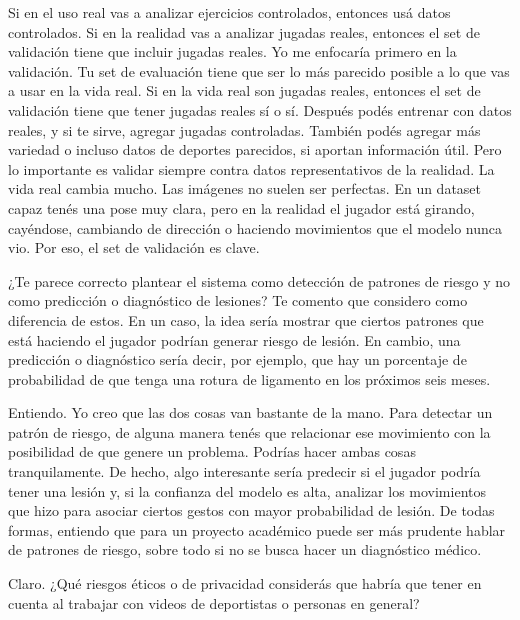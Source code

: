 \begin{description}[leftmargin=0pt, itemindent=\parindent, labelsep=0.5em, itemsep=0pt, parsep=0pt, topsep=0pt]
    \item[\textbf{Gonzalo Pereyra Metnyk:}] Si en el uso real vas a analizar ejercicios controlados, entonces usá datos controlados. Si en la realidad vas a analizar jugadas reales, entonces el set de validación tiene que incluir jugadas reales. Yo me enfocaría primero en la validación. Tu set de evaluación tiene que ser lo más parecido posible a lo que vas a usar en la vida real. Si en la vida real son jugadas reales, entonces el set de validación tiene que tener jugadas reales sí o sí. Después podés entrenar con datos reales, y si te sirve, agregar jugadas controladas. También podés agregar más variedad o incluso datos de deportes parecidos, si aportan información útil. Pero lo importante es validar siempre contra datos representativos de la realidad. La vida real cambia mucho. Las imágenes no suelen ser perfectas. En un dataset capaz tenés una pose muy clara, pero en la realidad el jugador está girando, cayéndose, cambiando de dirección o haciendo movimientos que el modelo nunca vio. Por eso, el set de validación es clave.

    \item[\textbf{Entrevistador:}] ¿Te parece correcto plantear el sistema como detección de patrones de riesgo y no como predicción o diagnóstico de lesiones? Te comento que considero como diferencia de estos. En un caso, la idea sería mostrar que ciertos patrones que está haciendo el jugador podrían generar riesgo de lesión. En cambio, una predicción o diagnóstico sería decir, por ejemplo, que hay un porcentaje de probabilidad de que tenga una rotura de ligamento en los próximos seis meses.

    \item[\textbf{Gonzalo Pereyra Metnyk:}] Entiendo. Yo creo que las dos cosas van bastante de la mano. Para detectar un patrón de riesgo, de alguna manera tenés que relacionar ese movimiento con la posibilidad de que genere un problema. Podrías hacer ambas cosas tranquilamente. De hecho, algo interesante sería predecir si el jugador podría tener una lesión y, si la confianza del modelo es alta, analizar los movimientos que hizo para asociar ciertos gestos con mayor probabilidad de lesión. De todas formas, entiendo que para un proyecto académico puede ser más prudente hablar de patrones de riesgo, sobre todo si no se busca hacer un diagnóstico médico.

    \item[\textbf{Entrevistador:}] Claro. ¿Qué riesgos éticos o de privacidad considerás que habría que tener en cuenta al trabajar con videos de deportistas o personas en general?


\end{description}
